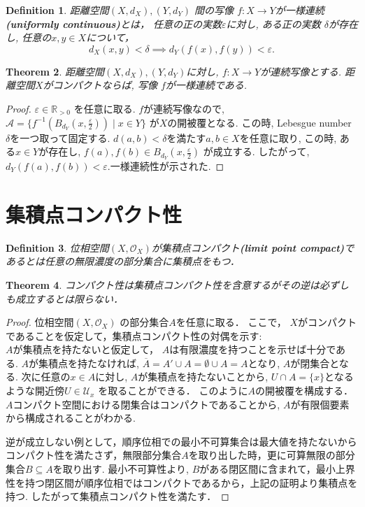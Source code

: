 \documentclass[lualatex]{ltjsbook}
\newcommand{\cl}[1]{\overline{ #1}  }
\newtheorem{theorem}{Theorem}[section]
\newtheorem{definition}[theorem]{Definition}
\theoremstyle{remark}
\theoremstyle{plain}
\begin{document}
\begin{definition}
	距離空間$\left( X,d_X \right) , \left( Y, d_Y \right) $ 間の写像
	$f:X \to Y$が一様連続\textbf{(uniformly continuous)}とは，
	任意の正の実数$\varepsilon$に対し, 
	ある正の実数 $\delta$が存在し,
	任意の$x,y \in X$について，
	 \[
	 d_X(x,y) < \delta \implies d_Y(f(x),f(y))<\varepsilon
	 .\] 
\end{definition}

\begin{theorem}
	距離空間$\left( X,d_X \right) ,(Y,d_Y)$に対し, $f: X \to Y$が連続写像とする. 距離空間$X$がコンパクトならば, 写像 $f$が一様連続である.		
\end{theorem}

\begin{proof}
$\varepsilon \in \mathbb{R}_{>0}$ を任意に取る.
$f$が連続写像なので,
$\mathcal{A}=\{f^{-1}\left(B_{d_Y}(x , \frac{\varepsilon}{2})\right)  \mid x \in Y\} $ 
が$X$の開被覆となる. 
この時, Lebesgue number  $\delta$を一つ取って固定する. 
$d\left( a,b \right) < \delta $を満たす$a,b \in X$を任意に取り, 
この時, ある$x \in Y$が存在し,  
$f(a),f(b) \in B_{d_Y}(x, \frac{\varepsilon}{2})$ が成立する. 
したがって, $d_Y(f(a),f(b)) < \varepsilon$.一様連続性が示された.
\end{proof}

\section{集積点コンパクト性}

\begin{definition}
	位相空間$\left( X , \mathcal{O}_{X} \right)$が集積点コンパクト\textbf{(limit point compact)}であるとは任意の無限濃度の部分集合に集積点をもつ．
\end{definition}

\begin{theorem}
	コンパクト性は集積点コンパクト性を含意するがその逆は必ずしも成立するとは限らない．
\end{theorem}

\begin{proof}
	位相空間$\left( X , \mathcal{O}_{X} \right)$ の部分集合$A$を任意に取る．
	ここで， $X$がコンパクトであることを仮定して，集積点コンパクト性の対偶を示す: \\
	 $A$が集積点を持たないと仮定して， $A$は有限濃度を持つことを示せば十分である.
	 $A$が集積点を持たなければ,  $\cl{A} = A ' \cup  A = \emptyset \cup A =A$となり, $A$が閉集合となる. 次に任意の$x \in A$に対し,  $A$が集積点を持たないことから,  $U \cap A = \{x\} $となるような開近傍$U \in \mathcal{U}_x$ を取ることができる．
	 このように$A$の開被覆を構成する． $A$コンパクト空間における閉集合はコンパクトであることから,  $A$が有限個要素から構成されることがわかる.

	 逆が成立しない例として，順序位相での最小不可算集合は最大値を持たないからコンパクト性を満たさず，無限部分集合$A$を取り出した時，更に可算無限の部分集合$B \subseteq A$を取り出す. 最小不可算性より, $B$がある閉区間に含まれて，最小上界性を持つ閉区間が順序位相ではコンパクトであるから，上記の証明より集積点を持つ. したがって集積点コンパクト性を満たす．
\end{proof}
\end{document}
